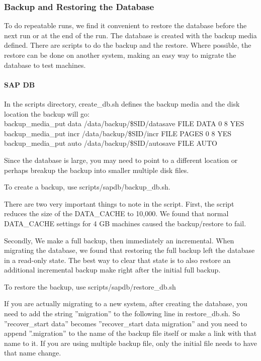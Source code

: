 \documentclass{article}
\begin{document}
\subsubsection{Backup and Restoring the Database}

To do repeatable runs, we find it convenient to restore the database before
the next run or at the end of the run.  The database is created with the
backup media defined.  There are scripts to do the backup and the restore.
Where possible, the restore can be done on another system, making an easy way
to migrate the database to test machines.

\paragraph{SAP DB}

In the scripts directory, create\_db.sh defines the backup media and the disk
location the backup will go: \\
\indent backup\_media\_put data /data/backup/\$SID/datasave FILE DATA 0 8 YES \\
\indent backup\_media\_put incr /data/backup/\$SID/incr FILE PAGES 0 8 YES \\
\indent backup\_media\_put auto /data/backup/\$SID/autosave FILE AUTO

\noindent
Since the database is large, you may need to point to a different location or
perhaps breakup the backup into smaller multiple disk files. 

\noindent
To create a backup, use scripts/sapdb/backup\_db.sh.

\noindent
There are two very important things to note in the script.  First, the script
reduces the size of the DATA\_CACHE to 10,000.   We found that normal
DATA\_CACHE settings for 4 GB machines caused the backup/restore to fail.

\noindent
Secondly, We make a full backup, then immediately an incremental.  When
migrating the database, we found that restoring the full backup left the
database in a read-only state.  The best way to clear that state is to also
restore an additional incremental backup make right after the initial full
backup.

\noindent
To restore the backup, use scripts/sapdb/restore\_db.sh

\noindent
If you are actually migrating to a new system, after creating the database,
you need to add the string ''migration'' to the following line in
restore\_db.sh.  So ''recover\_start data'' becomes
''recover\_start data migration'' and you need to append ''.migration'' to
the name of the backup file itself or make a link with that name to it.  If
you are using multiple backup file, only the initial file needs to have that
name change.
\end{document}
